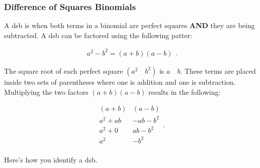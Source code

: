 
\subsubsection{Difference of Squares Binomials}
\label{sub_sub_sec:difference_of_squares_binomials}

\begin{definition}
  \label{def:difference_of_squares_binomials}

  A \gls{dsb} is when both terms in a binomial are perfect squares \textbf{AND}
  they are being subtracted. A \gls{dsb} can be factored using the following
  patter:

  \begin{equation}
    \label{eqt:dsb_pattern}
    \begin{split}
      a^{2} - b^{2} = (a + b)(a - b)
    \end{split}
  .\end{equation}
\end{definition}

\begin{note}
  \label{nte:dsb_pattern_note}

  The square root of each perfect square $(a^{2} \quad b^{2})$ is $a \quad b$.
  These terms are placed inside two sets of parentheses where one is addition
  and one is subtraction. Multiplying the two factors $(a + b)(a - b)$ results
  in the following:

  \begin{equation}
    \label{eqt:dsb_pattern_result}
    \begin{split}
      (a + b)&(a - b) \\
      a^{2} + ab &-ab - b^{2} \\
      a^{2} + 0&ab - b^{2} \\
      a^{2} &- b^{2} \\
    \end{split}
  .\end{equation}
\end{note}

Here's how you identify a \gls{dsb}.

